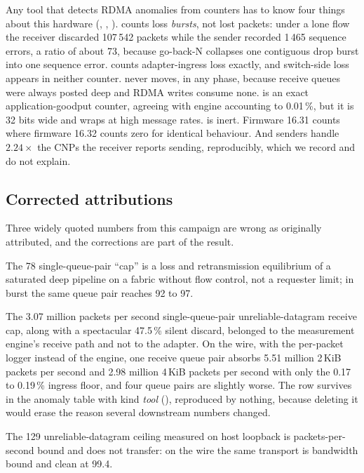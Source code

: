 Any tool that detects RDMA anomalies from counters has to know four things
about this hardware (, , ).
 counts loss \emph{bursts}, not lost packets: under a
lone flow the receiver discarded 107\,542 packets while the sender recorded
1\,465 sequence errors, a ratio of about 73, because go-back-N collapses one
contiguous drop burst into one sequence error.  counts
adapter-ingress loss exactly, and switch-side loss appears in neither counter.
 never moves, in any phase, because receive queues
were always posted deep and RDMA writes consume none. 
is an exact application-goodput counter, agreeing with engine accounting to
0.01\,\%, but it is 32 bits wide and wraps at high message rates.
 is inert. Firmware 16.31 counts
 where firmware 16.32 counts zero for identical
behaviour. And senders handle $2.24\times$ the CNPs the receiver reports
sending, reproducibly, which we record and do not explain.

\subsection{Corrected attributions}

Three widely quoted numbers from this campaign are wrong as originally
attributed, and the corrections are part of the result.

The 78\Gbps{} single-queue-pair ``cap'' is a loss and retransmission
equilibrium of a saturated deep pipeline on a fabric without flow control, not
a requester limit; in burst the same queue pair reaches 92 to 97\Gbps{}.

The 3.07 million packets per second single-queue-pair unreliable-datagram
receive cap, along with a spectacular 47.5\,\% silent discard, belonged to the
measurement engine's receive path and not to the adapter. On the wire, with the
per-packet logger instead of the engine, one receive queue pair absorbs 5.51
million 2\,KiB packets per second and 2.98 million 4\,KiB packets per second
with only the 0.17 to 0.19\,\% ingress floor, and four queue pairs are slightly
worse. The row survives in the anomaly table with kind \textit{tool}
(), reproduced by nothing, because deleting it would erase the reason
several downstream numbers changed.

The 129\Gbps{} unreliable-datagram ceiling measured on host loopback is
packets-per-second bound and does not transfer: on the wire the same transport
is bandwidth bound and clean at 99.4\Gbps{}.

